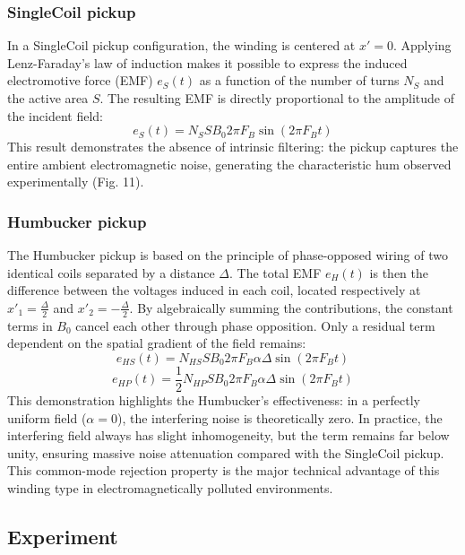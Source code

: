 \documentclass[11pt, a4paper]{article}
\begin{document}
\subsubsection{SingleCoil pickup}
In a SingleCoil pickup configuration, the winding is centered at $x' = 0$. Applying Lenz-Faraday's law of induction makes it possible to express the induced electromotive force (EMF) $e_S(t)$ as a function of the number of turns $N_S$ and the active area $S$. The resulting EMF is directly proportional to the amplitude of the incident field:
\begin{equation}
e_S(t) = N_S S B_0 2\pi F_B \sin(2\pi F_B t)
\end{equation}
This result demonstrates the absence of intrinsic filtering: the pickup captures the entire ambient electromagnetic noise, generating the characteristic hum observed experimentally (Fig. 11).

\subsubsection{Humbucker pickup}
The Humbucker pickup is based on the principle of phase-opposed wiring of two identical coils separated by a distance $\Delta$. The total EMF $e_H(t)$ is then the difference between the voltages induced in each coil, located respectively at $x'_1 = \frac{\Delta}{2}$ and $x'_2 = -\frac{\Delta}{2}$. By algebraically summing the contributions, the constant terms in $B_0$ cancel each other through phase opposition. Only a residual term dependent on the spatial gradient of the field remains:
\begin{equation}
e_{HS}(t) = N_{HS} S B_0 2\pi F_B \alpha \Delta \sin(2\pi F_B t)
\end{equation}
\begin{equation}
e_{HP}(t) = \frac{1}{2} N_{HP} S B_0 2\pi F_B \alpha \Delta \sin(2\pi F_B t)
\end{equation}
This demonstration highlights the Humbucker's effectiveness: in a perfectly uniform field ($\alpha = 0$), the interfering noise is theoretically zero. In practice, the interfering field always has slight inhomogeneity, but the term remains far below unity, ensuring massive noise attenuation compared with the SingleCoil pickup. This common-mode rejection property is the major technical advantage of this winding type in electromagnetically polluted environments.

\subsection{Experiment}
\end{document}
